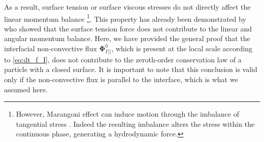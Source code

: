 As a result, surface tension or surface viscous stresses do not directly affect the linear momentum balance \footnote{However, Marangoni effect can induce motion through the imbalance of tangential stress \citep{young1959}. Indeed the resulting imbalance alters the stress within the continuous phase, generating a hydrodynamic force.}. 
This property has already been demonstrated by \citet{hesla1993note} who showed that the surface tension force does not contribute to the linear and angular momentum balance. 
Here, we have provided the general proof that the interfacial non-convective flux $\mathbf{\Phi}_{\Gamma||}^0$, which is present at the local scale according to \ref{eq:dt_f_I}, does not contribute to the zeroth-order conservation law of a particle with a closed surface.
It is important to note that this conclusion is valid only if the non-convective flux is parallel to the interface, which is what we assumed here.


